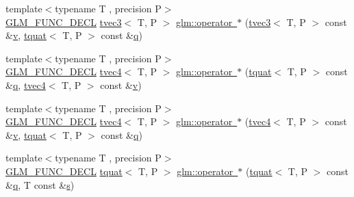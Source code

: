 \begin{DoxyCompactItemize}
\item 
{\footnotesize template$<$typename T , precision P$>$ }\\\mbox{\hyperlink{setup_8hpp_ab2d052de21a70539923e9bcbf6e83a51}{G\+L\+M\+\_\+\+F\+U\+N\+C\+\_\+\+D\+E\+CL}} \mbox{\hyperlink{structglm_1_1tvec3}{tvec3}}$<$ T, P $>$ \mbox{\hyperlink{group__gtc__quaternion_gaf630705b358b32f057587467fd0cca49}{glm\+::operator $\ast$}} (\mbox{\hyperlink{structglm_1_1tvec3}{tvec3}}$<$ T, P $>$ const \&\mbox{\hyperlink{glad_8h_a14cfbe2fc2234f5504618905b69d1e06}{v}}, \mbox{\hyperlink{structglm_1_1tquat}{tquat}}$<$ T, P $>$ const \&\mbox{\hyperlink{glad_8h_a514729309336df22bcc8eda979d6ced4}{q}})
\item 
{\footnotesize template$<$typename T , precision P$>$ }\\\mbox{\hyperlink{setup_8hpp_ab2d052de21a70539923e9bcbf6e83a51}{G\+L\+M\+\_\+\+F\+U\+N\+C\+\_\+\+D\+E\+CL}} \mbox{\hyperlink{structglm_1_1tvec4}{tvec4}}$<$ T, P $>$ \mbox{\hyperlink{group__gtc__quaternion_gab63797896ca2db7fd5afa10ee01cf60f}{glm\+::operator $\ast$}} (\mbox{\hyperlink{structglm_1_1tquat}{tquat}}$<$ T, P $>$ const \&\mbox{\hyperlink{glad_8h_a514729309336df22bcc8eda979d6ced4}{q}}, \mbox{\hyperlink{structglm_1_1tvec4}{tvec4}}$<$ T, P $>$ const \&\mbox{\hyperlink{glad_8h_a14cfbe2fc2234f5504618905b69d1e06}{v}})
\item 
{\footnotesize template$<$typename T , precision P$>$ }\\\mbox{\hyperlink{setup_8hpp_ab2d052de21a70539923e9bcbf6e83a51}{G\+L\+M\+\_\+\+F\+U\+N\+C\+\_\+\+D\+E\+CL}} \mbox{\hyperlink{structglm_1_1tvec4}{tvec4}}$<$ T, P $>$ \mbox{\hyperlink{group__gtc__quaternion_gaac2743bed4951a088d72e41e0c72a2cc}{glm\+::operator $\ast$}} (\mbox{\hyperlink{structglm_1_1tvec4}{tvec4}}$<$ T, P $>$ const \&\mbox{\hyperlink{glad_8h_a14cfbe2fc2234f5504618905b69d1e06}{v}}, \mbox{\hyperlink{structglm_1_1tquat}{tquat}}$<$ T, P $>$ const \&\mbox{\hyperlink{glad_8h_a514729309336df22bcc8eda979d6ced4}{q}})
\item 
{\footnotesize template$<$typename T , precision P$>$ }\\\mbox{\hyperlink{setup_8hpp_ab2d052de21a70539923e9bcbf6e83a51}{G\+L\+M\+\_\+\+F\+U\+N\+C\+\_\+\+D\+E\+CL}} \mbox{\hyperlink{structglm_1_1tquat}{tquat}}$<$ T, P $>$ \mbox{\hyperlink{group__gtc__quaternion_ga1e92069464e09ce81a9a27d67b9ef440}{glm\+::operator $\ast$}} (\mbox{\hyperlink{structglm_1_1tquat}{tquat}}$<$ T, P $>$ const \&\mbox{\hyperlink{glad_8h_a514729309336df22bcc8eda979d6ced4}{q}}, T const \&\mbox{\hyperlink{glad_8h_af1b1d5edfea6a34daee7389b1b5810ad}{s}})

\end{DoxyCompactItemize}
